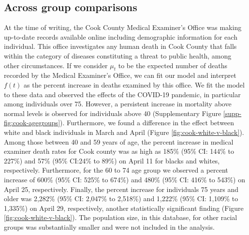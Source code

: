 \documentclass[11pt]{article}
\begin{document}
 

\subsection{Across group comparisons}
\label{subsec:group-comparison}
At the time of writing, the Cook County Medical Examiner's Office was making up-to-date records available online including demographic information for each individual. This office investigates any human death in Cook County that falls within the category of diseases constituting a threat to public health, among other circumstances\cite{cookcovid19}. If we consider $\mu_t$ to be the expected number of deaths recorded by the Medical Examiner's Office, we can fit our model and interpret $f(t)$ as the percent increase in deaths examined by this office. We fit the model to these data and observed the effects of the COVID-19 pandemic, in particular among individuals over 75. However, a persistent increase in mortality above normal levels is observed for individuals above 40 (Supplementary Figure \ref{supp-fig:cook-agegroups}). Furthermore, we found a difference in the effect between white and black individuals in March and April (Figure \ref{fig:cook-white-v-black}). Among those between 40 and 59 years of age, the percent increase in medical examiner death rates for Cook county was as high as 185\% (95\% CI: 144\% to 227\%) and 57\% (95\% CI:24\% to 89\%) on April 11 for blacks and whites, respectively. Furthermore, for the 60 to 74 age group we observed a percent increase of 600\% (95\% CI: 525\% to 674\%) and 480\% (95\% CI: 416\% to 543\%) on April 25, respectively. Finally, the percent increase for individuals 75 years and older was 2,282\% (95\% CI: 2,047\% to 2,518\%) and 1,222\% (95\% CI: 1,109\% to 1,335\%) on April 29, respectively, another statistically significant finding (Figure \ref{fig:cook-white-v-black}). The population size, in this database, for other racial groups was substantially smaller and were not included in the analysis.
\end{document}
